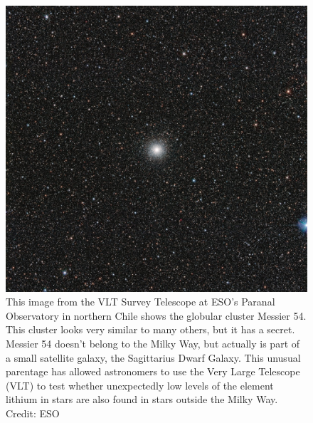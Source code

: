 \documentclass[12pt, twocolumn]{aastex62}
\begin{document}
\begin{figure}
	\includegraphics[scale=0.2]{m54_eso_0}
	\caption{This image from the VLT Survey Telescope at ESO’s Paranal Observatory in northern Chile shows the globular cluster Messier 54. This cluster looks very similar to many others, but it has a secret. Messier 54 doesn’t belong to the Milky Way, but actually is part of a small satellite galaxy, the Sagittarius Dwarf Galaxy. This unusual parentage has allowed astronomers to use the Very Large Telescope (VLT) to test whether unexpectedly low levels of the element lithium in stars are also found in  stars outside the Milky Way. \cite{eso_m54}\\Credit: ESO}
	\label{fig: m54_1}
\end{figure}
\end{document}
